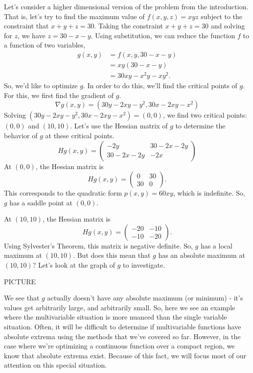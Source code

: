 \documentclass{ximera}
\begin{document}
Let's consider a higher dimensional version of the problem from the introduction. That is, let's try to find the maximum value of $f(x,y,z) = xyz$ subject to the constraint that $x+y+z=30$. Taking the constraint $x+y+z=30$ and solving for $z$, we have $z = 30-x-y$. Using substitution, we can reduce the function $f$ to a function of two variables,
\begin{align*}
g(x,y) &= f(x,y,30-x-y)\\
&= xy(30-x-y)\\
&= 30xy-x^2y-xy^2.
\end{align*}
So, we'd like to optimize $g$. In order to do this, we'll find the critical points of $g$. For this, we first find the gradient of $g$.
\[
\nabla g(x,y) = (30y-2xy-y^2, 30x-2xy-x^2)
\]
Solving $(30y-2xy-y^2, 30x-2xy-x^2) = (0,0)$, we find two critical points: $(0,0)$ and $(10,10)$. Let's use the Hessian matrix of $g$ to determine the behavior of $g$ at these critical points.
\[
Hg(x,y) = \begin{pmatrix}
-2y & 30-2x-2y\\
30-2x-2y & -2x
\end{pmatrix}
\]
At $(0,0)$, the Hessian matrix is
\[
Hg(x,y) = \begin{pmatrix}
0 & 30\\
30 & 0
\end{pmatrix}.
\]
This corresponds to the quadratic form $p(x,y) = 60xy$, which is indefinite. So, $g$ has a saddle point at $(0,0)$.

At $(10,10)$, the Hessian matrix is
\[
Hg(x,y) = \begin{pmatrix}
-20 & -10\\
-10 & -20
\end{pmatrix}.
\]
Using Sylvester's Theorem, this matrix is negative definite. So, $g$ has a local maximum at $(10,10)$. But does this mean that $g$ has an absolute maximum at $(10,10)$? Let's look at the graph of $g$ to investigate.

PICTURE

We see that $g$ actually doesn't have any absolute maximum (or minimum) - it's values get arbitrarily large, and arbitrarily small. So, here we see an example where the multivariable situation is more nuanced than the single variable situation. Often, it will be difficult to determine if multivariable functions have absolute extrema using the methods that we've covered so far. However, in the case where we're optimizing a continuous function over a compact region, we know that absolute extrema exist. Because of this fact, we will focus most of our attention on this special situation.
\end{document}
